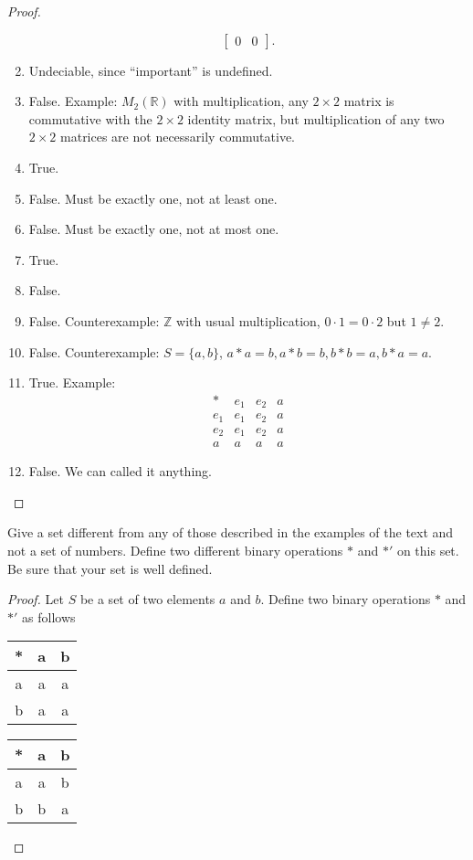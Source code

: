 \begin{proof}
\begin{enumerate}[label={\textbf{\alph*.}},itemsep=0pt,topsep=0pt]
\[\begin{bmatrix}
                      0 & 0
                  \end{bmatrix}.
              \]
        \item Undeciable, since ``important'' is undefined.
        \item False. Example: $M_{2}(\mathbb{R})$ with multiplication, any $2\times 2$ matrix is commutative with the $2\times 2$ identity matrix, but multiplication of any two $2\times 2$ matrices are not necessarily commutative.
        \item True.
        \item False. Must be exactly one, not at least one.
        \item False. Must be exactly one, not at most one.
        \item True.
        \item False.
        \item False. Counterexample: $\mathbb{Z}$ with usual multiplication, $0 \cdot 1 = 0 \cdot 2$ but $1 \ne 2$.
        \item False. Counterexample: $S = \{ a, b \}$, $a * a = b, a * b = b, b * b = a, b * a = a$.
        \item True. Example:
              \[
                  \begin{array}{c|ccc}
                      *     & e_{1} & e_{2} & a \\
                      \hline
                      e_{1} & e_{1} & e_{2} & a \\
                      e_{2} & e_{1} & e_{2} & a \\
                      a     & a     & a     & a
                  \end{array}
              \]
        \item False. We can called it anything.
    \end{enumerate}
\end{proof}

\begin{exercise}
    Give a set different from any of those described in the examples of the text and not a set of numbers. Define two different binary operations $*$ and $*'$ on this set. Be sure that your set is well defined.
\end{exercise}

\begin{proof}
    Let $S$ be a set of two elements $a$ and $b$. Define two binary operations $*$ and $*'$ as follows
    \begin{tabular}{c|cc}
        * & a & b \\
        \hline
        a & a & a \\
        b & a & a
    \end{tabular}
    \begin{tabular}{c|cc}
        * & a & b \\
        \hline
        a & a & b \\
        b & b & a
    \end{tabular}
\end{proof}

